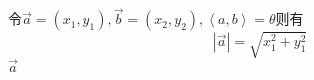 令$\overrightarrow a  = \left( {{x_1},{y_1}} \right),\overrightarrow b  = \left( {{x_2},{y_2}} \right),\left\langle {a,b} \right\rangle  = \theta $则有
\begin{equation}
\left| {\overrightarrow a } \right| = \sqrt {x_1^2 + y_1^2}
\end{equation}
$\overrightarrow a$